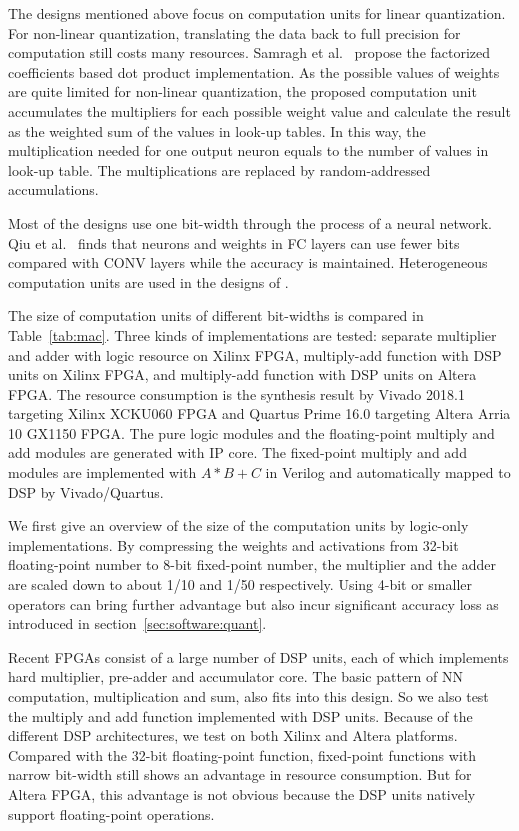 The designs mentioned above focus on computation units for linear quantization. For non-linear quantization, translating the data back to full precision for computation still costs many resources. Samragh et al.~\cite{samragh2017customizing} propose the factorized coefficients based dot product implementation. As the possible values of weights are quite limited for non-linear quantization, the proposed computation unit accumulates the multipliers for each possible weight value and calculate the result as the weighted sum of the values in look-up tables. In this way, the multiplication needed for one output neuron equals to the number of values in look-up table. The multiplications are replaced by random-addressed accumulations.

Most of the designs use one bit-width through the process of a neural network. Qiu et al.~\cite{qiu2016going} finds that neurons and weights in FC layers can use fewer bits compared with CONV layers while the accuracy is maintained. Heterogeneous computation units are used in the designs of \cite{zhao2017accelerating, guo2017bit}.

The size of computation units of different bit-widths is compared in Table~\ref{tab:mac}. Three kinds of implementations are tested: separate multiplier and adder with logic resource on Xilinx FPGA, multiply-add function with DSP units on Xilinx FPGA, and multiply-add function with DSP units on Altera FPGA. The resource consumption is the synthesis result by Vivado 2018.1 targeting Xilinx XCKU060 FPGA and Quartus Prime 16.0 targeting Altera Arria 10 GX1150 FPGA. The pure logic modules and the floating-point multiply and add modules are generated with IP core. The fixed-point multiply and add modules are implemented with $A*B+C$ in Verilog and automatically mapped to DSP by Vivado/Quartus.

We first give an overview of the size of the computation units by logic-only implementations. By compressing the weights and activations from 32-bit floating-point number to 8-bit fixed-point number, the multiplier and the adder are scaled down to about 1/10 and 1/50 respectively. Using 4-bit or smaller operators can bring further advantage but also incur significant accuracy loss as introduced in section~\ref{sec:software:quant}. 

Recent FPGAs consist of a large number of DSP units, each of which implements hard multiplier, pre-adder and accumulator core. The basic pattern of NN computation, multiplication and sum, also fits into this design. So we also test the multiply and add function implemented with DSP units. Because of the different DSP architectures, we test on both Xilinx and Altera platforms. Compared with the 32-bit floating-point function, fixed-point functions with narrow bit-width still shows an advantage in resource consumption. But for Altera FPGA, this advantage is not obvious because the DSP units natively support floating-point operations. 

